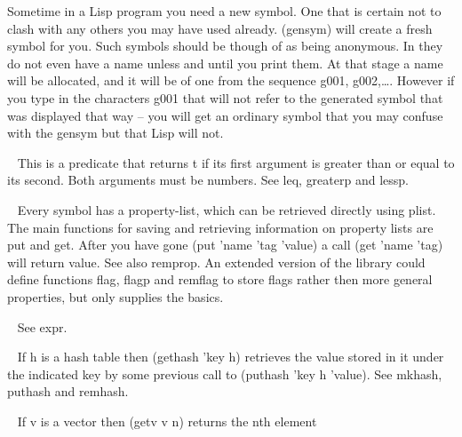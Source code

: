 \begin{description}
Sometime in a Lisp program you need a new symbol. One that is certain not to
clash with any others you may have used already. {\tx (gensym)} will create
a fresh symbol for you. Such symbols should be though of as being anonymous.
In \vsl{} they do not even have a name unless and until you print them. At
that stage a name will be allocated, and it will be of one from the
sequence {\tx g001}, {\tx g002},\ldots. However if you type in the characters
{\tx g001} that will not refer to the generated symbol that was displayed
that way -- you will get an ordinary symbol that you may confuse with the
gensym but that Lisp will not.
\item[{\tx geq~~~~~~~~~~} \hspace{1cm} {\em function 2 args}]~\newline
This is a predicate that returns {\tx t} if its first argument is
greater than or equal to its second. Both arguments must be numbers. See
{\tx leq}, {\tx greaterp} and {\tx lessp}.
\item[{\tx get~~~~~~~~~~} \hspace{1cm} {\em function 2 args}]~\newline
Every symbol has a property-list, which can be retrieved directly using
{\tx plist}. The main functions for saving and retrieving information
on property lists are {\tx put} and {\tx get}. After you have gone
{\tx (put 'name 'tag 'value)} a call {\tx (get 'name 'tag)} will return {\tx
value}. See also {\tx remprop}. An extended version of the library could define
functions {\tx flag}, {\tx flagp} and {\tx remflag} to store flags rather
then more general properties, but \vsl{} only supplies the basics.
\item[{\tx getd~~~~~~~~~} \hspace{1cm} {\em function 1 arg}]~\newline
See {\tx expr}.
\item[{\tx gethash~~~~~~} \hspace{1cm} {\em function 2 args}]~\newline
If {\tx h} is a hash table then {\tx (gethash 'key h)} retrieves the value
stored in it under the indicated {\tx key} by some previous call to
{\tx (puthash 'key h 'value)}. See {\tx mkhash}, {\tx puthash} and {\tx remhash}.
\item[{\tx getv~~~~~~~~~} \hspace{1cm} {\em function 2 args}]~\newline
If {\tx v} is a vector then {\tx (getv v n)} returns the {\tx n}th element

\end{description}
